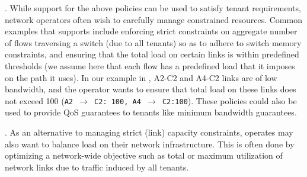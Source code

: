 . While
  support for the above policies can be used to satisfy tenant 
  requirements, network operators often wish to
  carefully manage constrained resources. 
  Common examples that \Name
  supports include enforcing strict constraints on aggregate number of
  flows traversing a switch (due to all tenants) so as to adhere to
  switch memory constraints, and ensuring that the total load on
  certain links is within predefined thresholds (we assume here that
  each flow has a predefined load that it imposes on the path it
  uses). In our example in , A2-C2 and A4-C2
  links are of low bandwidth, and the operator wants to ensure that
  total load on these links does not exceed 100 
  (\texttt{A2 $\rightarrow$ C2: 100, A4 $\rightarrow$ C2:100}). These 
  policies could also be used to provide QoS guarantees to tenants like
  minimum bandwidth guarantees. 

. As an alternative to
  managing strict (link) capacity constraints, operates may also want
  to balance load on their network infrastructure. This is often done
  by optimizing a network-wide objective such as total or maximum
  utilization of network links due to traffic induced by all tenants.
  
  

